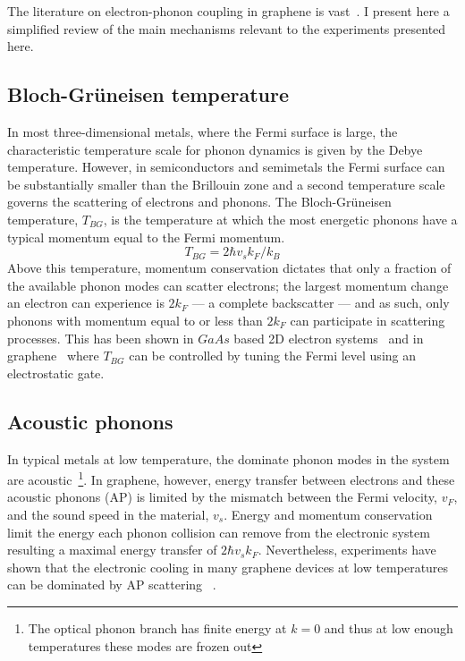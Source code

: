 The literature on electron-phonon coupling in graphene is vast~\cite{??,shaffique,flexure,sohier_phonon-limited_2014}. I present here a simplified review of the main mechanisms relevant to the experiments presented here.

\subsection{Bloch-Gr{\"u}neisen temperature}
In most three-dimensional metals, where the Fermi surface is large, the characteristic temperature scale for phonon dynamics is given by the Debye temperature. However, in semiconductors and semimetals the Fermi surface can be substantially smaller than the Brillouin zone and a second temperature scale governs the scattering of electrons and phonons. The Bloch-Gr{\"u}neisen temperature, $T_{BG}$, is the temperature at which the most energetic phonons have a typical momentum equal to the Fermi momentum\cite{bloch_zum_1930, gruneisen_abhangigkeit_1933}.
\begin{equation}\label{eq:TBG}
T_{BG} = 2\hbar v_sk_F/k_B
\end{equation}
Above this temperature, momentum conservation dictates that only a fraction of the available phonon modes can scatter electrons; the largest momentum change an electron can experience is $2k_F$ --- a complete backscatter --- and as such, only phonons with momentum equal to or less than $2k_F$ can participate in scattering processes. This has been shown in $GaAs$ based 2D electron systems~\cite{stormer_observation_1990} and in graphene~\cite{efetov_controlling_2010} where $T_{BG}$ can be controlled by tuning the Fermi level using an electrostatic gate.

\subsection{Acoustic phonons}
In typical metals at low temperature, the dominate phonon modes in the system are acoustic~\cite{ashcroft_solid_1976}\footnote{The optical phonon branch has finite energy at $k=0$ and thus at low enough temperatures these modes are frozen out}. In graphene, however, energy transfer between electrons and these acoustic phonons (AP) is limited by the mismatch between the Fermi velocity, $v_F$, and the sound speed in the material, $v_s$. Energy and momentum conservation limit the energy each phonon collision can remove from the electronic system resulting a maximal energy transfer of $2\hbar v_sk_F$. Nevertheless, experiments have shown that the electronic cooling in many graphene devices at low temperatures can be dominated by AP scattering~\cite{fong_measurement_2013, betz_supercollision_2013, graham_photocurrent_2013} .

